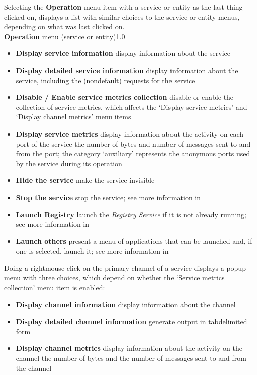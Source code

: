 \condPage{}
Selecting the \textbf{Operation} menu item with a service or entity as the last thing
clicked on, displays a list with similar choices to the service or entity menus,
depending on what was last clicked on.\\
%
{\textbf{Operation} menu (service or entity)}{1.0}
\begin{itemize}
\item\textbf{Display service information} display information about the service
\item\exSp\textbf{Display detailed service information} display information about the
service, including the (non\longDash{}default) requests for the service
\item\exSp\textbf{Disable / Enable service metrics collection} disable or enable the
collection of service metrics, which affects the `Display service metrics' and `Display
channel metrics' menu items
\item\exSp\textbf{Display service metrics} display information about the activity on each
port of the service \longDash{} the number of bytes and number of messages sent to and
from the port; the category `auxiliary' represents the anonymous ports used by the service
during its operation
\item\exSp\textbf{Hide the service} make the service invisible
\item\exSp\textbf{Stop the service} stop the service; see more information in
\item\exSp\textbf{Launch Registry} launch the \emph{Registry Service} if it is not already
running; see more information in\\
\item\exSp\textbf{Launch others \textellipsis} present a menu of applications that can be
launched and, if one is selected, launch it; see more information in
\end{itemize}
\condPage{}
Doing a right\longDash{}mouse click on the primary channel of a service displays a popup
menu with three choices, which depend on whether the `Service metrics collection' menu
item is enabled:
\begin{itemize}
\item\textbf{Display channel information} display information about the channel
\item\exSp\textbf{Display detailed channel information} generate output in
tab\longDash{}delimited form
\item\exSp\textbf{Display channel metrics} display information about the activity on the
channel \longDash{} the number of bytes and the number of messages sent to and from the
channel
\end{itemize}
